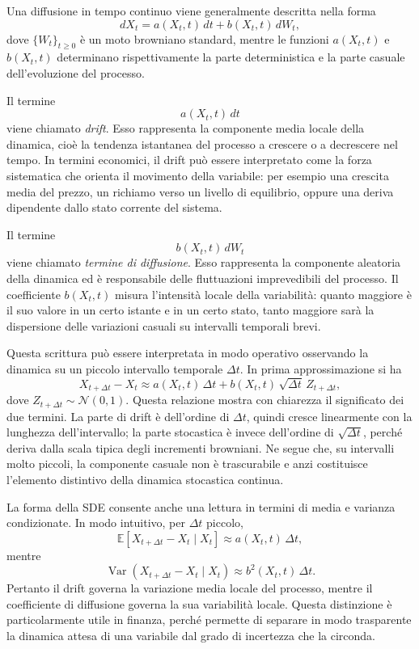Una diffusione in tempo continuo viene generalmente descritta nella forma
\[
dX_t = a(X_t,t)\,dt + b(X_t,t)\,dW_t,
\]
dove $\{W_t\}_{t\geq 0}$ \`e un moto browniano standard, mentre le
funzioni $a(X_t,t)$ e $b(X_t,t)$ determinano rispettivamente la parte
deterministica e la parte casuale dell'evoluzione del processo.

Il termine
\[
a(X_t,t)\,dt
\]
viene chiamato \emph{drift}. Esso rappresenta la componente media locale
della dinamica, cio\`e la tendenza istantanea del processo a crescere o a
decrescere nel tempo. In termini economici, il drift pu\`o essere
interpretato come la forza sistematica che orienta il movimento della
variabile: per esempio una crescita media del prezzo, un richiamo verso
un livello di equilibrio, oppure una deriva dipendente dallo stato
corrente del sistema.

Il termine
\[
b(X_t,t)\,dW_t
\]
viene chiamato \emph{termine di diffusione}. Esso rappresenta la
componente aleatoria della dinamica ed \`e responsabile delle
fluttuazioni imprevedibili del processo. Il coefficiente $b(X_t,t)$
misura l'intensit\`a locale della variabilit\`a: quanto maggiore \`e il
suo valore in un certo istante e in un certo stato, tanto maggiore sar\`a
la dispersione delle variazioni casuali su intervalli temporali brevi.

Questa scrittura pu\`o essere interpretata in modo operativo osservando
la dinamica su un piccolo intervallo temporale $\Delta t$. In prima
approssimazione si ha
\[
X_{t+\Delta t}-X_t
\approx
a(X_t,t)\,\Delta t + b(X_t,t)\,\sqrt{\Delta t}\,Z_{t+\Delta t},
\]
dove $Z_{t+\Delta t}\sim \mathcal{N}(0,1)$. Questa relazione mostra con
chiarezza il significato dei due termini. La parte di drift \`e dell'ordine
di $\Delta t$, quindi cresce linearmente con la lunghezza
dell'intervallo; la parte stocastica \`e invece dell'ordine di
$\sqrt{\Delta t}$, perch\'e deriva dalla scala tipica degli incrementi
browniani. Ne segue che, su intervalli molto piccoli, la componente
casuale non \`e trascurabile e anzi costituisce l'elemento distintivo
della dinamica stocastica continua.

La forma della SDE consente anche una lettura in termini di media e
varianza condizionate. In modo intuitivo, per $\Delta t$ piccolo,
\[
\mathbb{E}\left[X_{t+\Delta t}-X_t \mid X_t\right]
\approx
a(X_t,t)\,\Delta t,
\]
mentre
\[
\operatorname{Var}\left(X_{t+\Delta t}-X_t \mid X_t\right)
\approx
b^2(X_t,t)\,\Delta t.
\]
Pertanto il drift governa la variazione media locale del processo,
mentre il coefficiente di diffusione governa la sua variabilit\`a locale.
Questa distinzione \`e particolarmente utile in finanza, perch\'e permette
di separare in modo trasparente la dinamica attesa di una variabile dal
grado di incertezza che la circonda.

